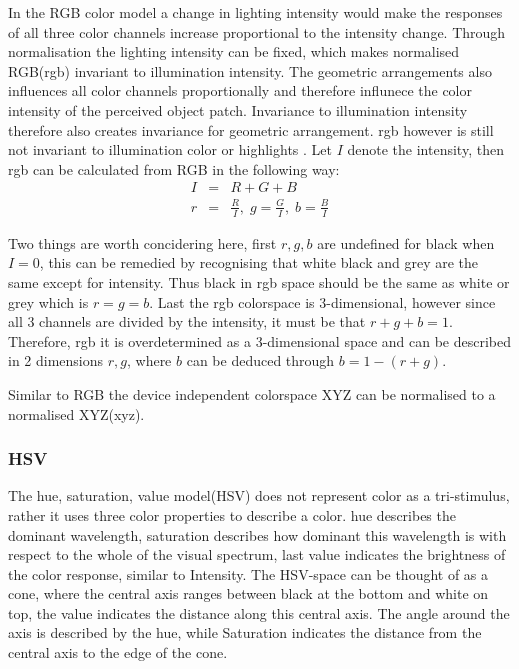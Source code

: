 \documentclass[a4paper,11pt]{article}
\begin{document}
In the RGB color model a change in lighting intensity would make the responses of all three color channels increase proportional to the intensity change. Through normalisation the lighting intensity can be fixed, which makes normalised RGB(rgb) invariant to illumination intensity. The geometric arrangements also influences all color channels proportionally and therefore influnece the color intensity of the perceived object patch. Invariance to illumination intensity therefore also creates invariance for geometric arrangement. rgb however is still not invariant to illumination color or highlights \cite{gevers_invariant}. 
Let $I$ denote the intensity, then rgb can be calculated from RGB in the following way:
\begin{eqnarray}
\label{eq:rgb}
I &=& R+G+B \\
r &=& \frac{R}{I},\; g = \frac{G}{I},\; b = \frac{B}{I}
\end{eqnarray}

Two things are worth concidering here, first $r,g,b$ are undefined for black when $I=0$, this can be remedied by recognising that white black and grey are the same except for intensity. Thus black in rgb space should be the same as white or grey which is $r=g=b$. Last the rgb colorspace is 3-dimensional, however since all 3 channels are divided by the intensity, it must be that $r+g+b=1$. Therefore, rgb it is overdetermined as a 3-dimensional space and can be described in 2 dimensions $r,g$, where $b$ can be deduced through $b=1-(r+g)$.

Similar to RGB the device independent colorspace XYZ can be normalised to a normalised XYZ(xyz).		
		
\subsubsection{HSV}
The hue, saturation, value model(HSV) does not represent color as a tri-stimulus, rather it uses three color properties to describe a color. hue describes the dominant wavelength, saturation describes how dominant this wavelength is with respect to the whole of the visual spectrum, last value indicates the brightness of the color response, similar to Intensity. The HSV-space can be thought of as a cone, where the central axis ranges between black at the bottom and white on top, the value indicates the distance along this central axis. The angle around the axis is described by the hue, while Saturation indicates the distance from the central axis to the edge of the cone. 
\end{document}
